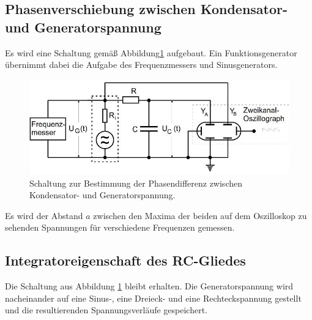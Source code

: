 \subsection{Phasenverschiebung zwischen Kondensator- und Generatorspannung}
Es wird eine Schaltung gemäß Abbildung\ref{fig:c}
aufgebaut. Ein Funktionsgenerator übernimmt dabei die Aufgabe des Frequenzmessers und Sinusgenerators.
\begin{figure}
\centering
\includegraphics[width=\linewidth-70pt,height=\textheight-70pt,keepaspectratio]{content/images/c.jpg}
\caption{Schaltung zur Bestimmung der Phasendifferenz zwischen Kondensator- und Generatorspannung.\cite{V353}}
\label{fig:c}
\end{figure}
\newline Es wird der Abstand $a$ zwischen den Maxima der beiden auf dem Oszilloskop zu sehenden Spannungen für verschiedene Frequenzen gemessen.
\subsection{Integratoreigenschaft des RC-Gliedes}
Die Schaltung aus Abbildung \ref{fig:c} bleibt erhalten.
Die Generatorspannung wird nacheinander auf eine Sinus-, eine Dreieck- und eine Rechteckspannung gestellt und die resultierenden Spannungsverläufe gespeichert.